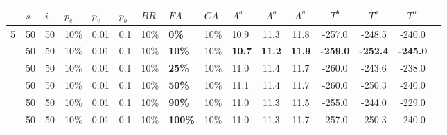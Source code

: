 \begin{sidewaystable}
    \centering
    \begin{tabular}{|l|l|l|l|l|l|l|l|l|l||c|c|c|c|c|c|}
    \hline
    ~ & $s$ & $i$ & $p_{e}$ & $p_{v}$ & $p_{b}$ & $BR$ & $FA$ & $CA$ & $A^b$ & $A^a$ & $A^w$ & $T^b$ & $T^a$ & $T^w$\\
    \hline
 
    5 & 50 & 50 & 10\% & 0.01 & 0.1 & 10\% & \textbf{0\%} & 10\% & 10.9 & 11.3 & 11.8 & -257.0 & -248.5 & -240.0 \\
    ~ & 50 & 50 & 10\% & 0.01 & 0.1 & 10\% & \textbf{10\%} & 10\% & \textbf{10.7} & \textbf{11.2} & \textbf{11.9} & \textbf{-259.0} & \textbf{-252.4} & \textbf{-245.0} \\
    ~ & 50 & 50 & 10\% & 0.01 & 0.1 & 10\% & \textbf{25\%} & 10\% & 11.0 & 11.4 & 11.7 & -260.0 & -243.6 & -238.0 \\
    ~ & 50 & 50 & 10\% & 0.01 & 0.1 & 10\% & \textbf{50\%} & 10\% & 11.1 & 11.4 & 11.7 & -260.0 & -250.3 & -240.0 \\
    ~ & 50 & 50 & 10\% & 0.01 & 0.1 & 10\% & \textbf{90\%} & 10\% & 11.0 & 11.3 & 11.5 & -255.0 & -244.0 & -229.0 \\
    ~ & 50 & 50 & 10\% & 0.01 & 0.1 & 10\% & \textbf{100\%} & 10\% & 11.0 & 11.3 & 11.7 & -257.0 & -250.3 & -240.0 \\


\end{tabular}
\end{sidewaystable}
